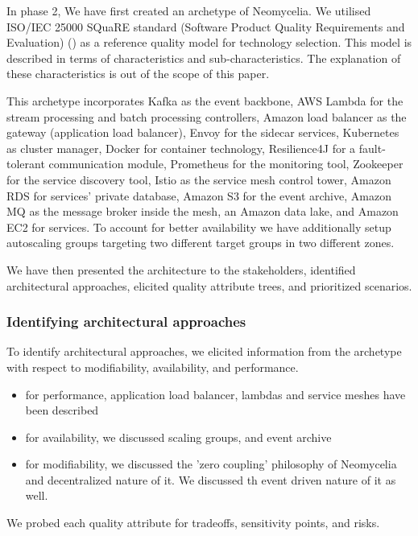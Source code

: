 \documentclass[conference]{IEEEtran}
\begin{document}
In phase 2, We have first created an archetype of Neomycelia. We utilised ISO/IEC 25000 SQuaRE standard (Software Product Quality Requirements and Evaluation) (\cite{Iso}) as a reference quality model for technology selection. This model is described in terms of characteristics and sub-characteristics. The explanation of these characteristics is out of the scope of this paper.

This archetype incorporates Kafka as the event backbone, AWS Lambda for the stream processing and batch processing controllers, Amazon load balancer as the gateway (application load balancer), Envoy for the sidecar services, Kubernetes as cluster manager, Docker for container technology, Resilience4J for a fault-tolerant communication module, Prometheus for the monitoring tool, Zookeeper for the service discovery tool, Istio as the service mesh control tower, Amazon RDS for services' private database, Amazon S3 for the event archive, Amazon MQ as the message broker inside the mesh, an Amazon data lake, and Amazon EC2 for services. To account for better availability we have additionally setup autoscaling groups targeting two different target groups in two different zones.

We have then presented the architecture to the stakeholders, identified architectural approaches, elicited quality attribute trees, and prioritized scenarios.

\subsubsection{Identifying architectural approaches}

To identify architectural approaches, we elicited information from the archetype with respect to modifiability, availability, and performance.

\begin{itemize}
    \item for performance, application load balancer, lambdas and service meshes have been described
    \item for availability, we discussed scaling groups, and event archive
    \item for modifiability, we discussed the 'zero coupling' philosophy of Neomycelia and decentralized nature of it. We discussed th event driven nature of it as well.
\end{itemize}

We probed each quality attribute for tradeoffs, sensitivity points, and risks.
\end{document}
